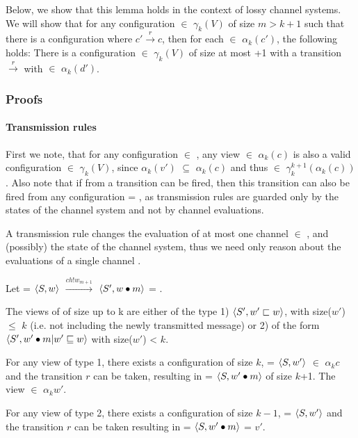 Below, we show that this lemma holds in the context of lossy channel systems. We will show that for any configuration  $\in$ $\gamma_k(V)$ of size $m > k + 1$ such that there is a configuration  where $c' \xrightarrow{r} c$, then for each  $\in$ $\alpha_k(c')$, the following holds: There is a configuration  $\in$ $\gamma_k(V)$ of size at most +1 with a transition  $\xrightarrow{r}$  with  $\in$ $\alpha_k(d')$. 

\subsubsection{Proofs}

\paragraph{Transmission rules}
\label{proofTransmission}
First we note, that for any configuration  $\in$ , any view  $\in$ $\alpha_k(c)$ is also a valid configuration  $\in$ $\gamma_k(V)$, since $\alpha_k(v')$ $\subseteq$ $\alpha_k(c)$ and thus  $\in$ $\gamma_k^{k+1}(\alpha_k(c))$. Also note that if from  a transition  can be fired, then this transition can also be fired from any configuration  = , as transmission rules are guarded only by the states of the channel system and not by channel evaluations.

A transmission rule changes the evaluation of at most one channel  $\in$ , and (possibly) the state of the channel system, thus we need only reason about the evaluations of a single channel .

Let  = $\langle S, w\rangle$ $\xrightarrow{ch!w_{m+1}}$ $\langle S', w \bullet m\rangle$ = .

The views of  of size up to k are either of the type 1) $\langle S', w' \sqsubset w\rangle$, with size($w'$) $\leq$ $k$ (i.e. not including the newly transmitted message) or 2) of the form $\langle S', w' \bullet m | w' \sqsubseteq w\rangle$ with size($w'$) < $k$.

For any view of type 1, there exists a configuration of size $k$,  = $\langle S, w'\rangle$ $\in$ $\alpha_k{c}$ and the transition $r$ can be taken, resulting in  = $\langle S, w'\bullet m\rangle$ of size $k$+1. The view  $\in$ $\alpha_k{w'}$.

For any view of type 2, there exists a configuration of size $k-1$,  = $\langle S, w'\rangle$ and the transition $r$ can be taken resulting in  = $\langle S, w'\bullet m\rangle$ = $v'$.

